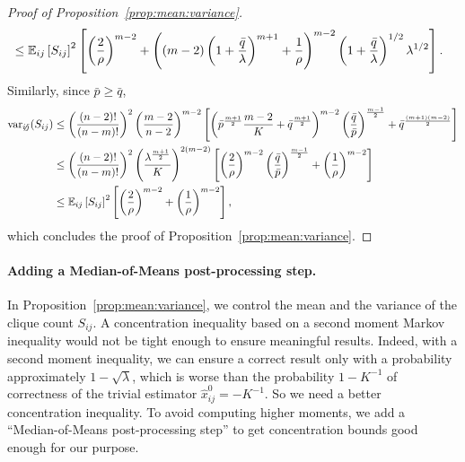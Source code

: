 \documentclass[final]{colt2026}
\newcommand{\1}{\mathbf{1}}
\newcommand{\bbE}{\mathbb{E}}
\newcommand{\pa}[1]{\left(#1\right)}
\newcommand{\cro}[1]{\left[#1\right]}
\begin{document}
\begin{proof}[Proof of Proposition~\ref{prop:mean:variance}]
\begin{align*}
& \leq \bbE_{ij}\cro{S_{ij}}^{2}\cro{\pa{2\over \rho}^{m-2}+\pa{(m-2)\pa{1+{\bar q\over \lambda}}^{m+1}+{1\over \rho}}^{m-2}\pa{1+{\bar q\over \lambda}}^{1/2}\lambda^{1/2}}.
\end{align*}
Similarly, since $\bar p\geq \bar q$,
\begin{align*}
 \mathrm{var}_{\not ij}(S_{ij}) & \leq \pa{(n-2)! \over (n-m)!}^2 \pa{m-2\over n-2}^{m-2}
 \cro{\pa{\bar p^{m+1\over 2}{m-2\over K}+\bar q^{m+1\over 2}}^{m-2}\pa{\bar q\over \bar p}^{{m-1\over 2}}+{\bar q^{(m+1)(m-2)\over 2}} }\\
&\leq  \pa{(n-2)! \over (n-m)!}^2  \pa{\lambda^{m+1\over 2} \over K}^{2(m-2)}\cro{\pa{2\over \rho}^{m-2}\pa{\bar q\over \bar p}^{{m-1\over 2}}+{\pa{{1\over \rho}}^{m-2}}}\\
& \leq \bbE_{ij}\cro{S_{ij}}^{2}\cro{\pa{2\over \rho}^{m-2}+\pa{{1\over \rho}}^{m-2}},
\end{align*}
which concludes the proof of Proposition~\ref{prop:mean:variance}.
\end{proof}






\paragraph{Adding a Median-of-Means post-processing step.}
In Proposition~\ref{prop:mean:variance}, we control the mean and the variance of the clique count $S_{ij}$. A concentration inequality based on a second moment Markov inequality would not be tight enough to ensure meaningful results. Indeed, with a second moment inequality, we can ensure a correct result only with a probability approximately $1-\sqrt{\lambda}$, which is worse than the probability $1-K^{-1}$ of correctness of the trivial estimator $\hat x_{ij}^{0}=-K^{-1}$. So we need a better concentration inequality.
To avoid computing higher moments, we add a ``Median-of-Means post-processing step'' to get  concentration bounds good enough for our purpose.
\end{document}
